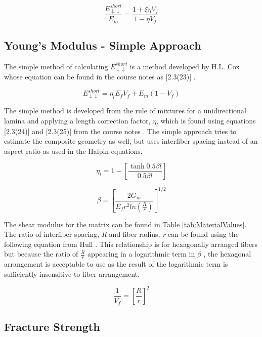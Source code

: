 \documentclass[11pt]{article}
\begin{document}
\begin{equation} \label{eq:halpin}
\frac{E^{short}_{\downarrow \downarrow}}{E_m} = \frac{1+\xi \eta V_f}{1-\eta V_f}
\end{equation}

\subsection{Young's Modulus - Simple Approach}

The simple method of calculating \(E_{\downarrow \downarrow}^{short}\) is a method developed by H.L. Cox whose equation can be found in the course notes as [2.3(23)] \cite{course_notes}.

\begin{equation} \label{eq:simple}
E^{short}_{\downarrow \downarrow} = \eta_l E_f V_f + E_m(1-V_f)
\end{equation}

The simple method is developed from the rule of mixtures for a unidirectional lamina and applying a length correction factor, \(\eta_l\) which is found using equations [2.3(24)] and [2.3(25)] from the course notes \cite{course_notes}. The simple approach tries to estimate the composite geometry as well, but uses interfiber spacing instead of an aspect ratio as used in the Halpin equations.

\begin{equation}
\eta_l = 1- \left[\frac{\tanh 0.5\beta l}{0.5\beta l} \right]
\end{equation}

\begin{equation}
\beta=\left[\frac{2G_m}{E_fr^2 ln(\frac{R}{r})}\right]^{1/2}
\end{equation}

The shear modulus for the matrix can be found in Table \ref{tab:MaterialValues}. The ratio of interfiber spacing, \textit{R} and fiber radius, \textit{r} can be found using the following equation from Hull \cite{hull}. This relationship is for hexagonally arranged fibers but because the ratio of \(\frac{R}{r}\) appearing in a logarithmic term in \(\beta\) , the hexagonal arrangement is acceptable to use as the result of the logarithmic term is sufficiently insensitive to fiber arrangement.

\begin{equation}
\frac{1}{V_f}=\left[\frac{R}{r}\right]^2
\end{equation}

\subsection{Fracture Strength}
\end{document}
